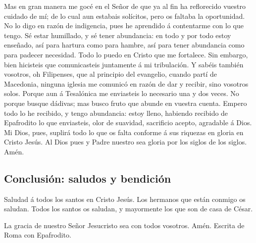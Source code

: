  Mas en gran manera me gocé en el Señor de que ya al fin
ha reflorecido vuestro cuidado de mí; de lo cual aun estabais solícitos,
pero os faltaba la oportunidad.  No lo digo en razón de
indigencia, pues he aprendido á contentarme con lo que tengo.
 Sé estar humillado, y sé tener abundancia: en todo y por
todo estoy enseñado, así para hartura como para hambre, así para tener
abundancia como para padecer necesidad.  Todo lo puedo en
Cristo que me fortalece.  Sin embargo, bien hicisteis que
comunicasteis juntamente á mi tribulación.  Y sabéis
también vosotros, oh Filipenses, que al principio del evangelio, cuando
partí de Macedonia, ninguna iglesia me comunicó en razón de dar y
recibir, sino vosotros solos.  Porque aun á Tesalónica me
enviasteis lo necesario una y dos veces.  No porque
busque dádivas; mas busco fruto que abunde en vuestra cuenta.
 Empero todo lo he recibido, y tengo abundancia: estoy
lleno, habiendo recibido de Epafrodito lo que enviasteis, olor de
suavidad, sacrificio acepto, agradable á Dios.  Mi Dios,
pues, suplirá todo lo que os falta conforme á sus riquezas en gloria en
Cristo Jesús.  Al Dios pues y Padre nuestro sea gloria
por los siglos de los siglos. Amén.

\hypertarget{conclusiuxf3n-saludos-y-bendiciuxf3n}{%
\subsection{Conclusión: saludos y
bendición}\label{conclusiuxf3n-saludos-y-bendiciuxf3n}}

 Saludad á todos los santos en Cristo Jesús. Los hermanos
que están conmigo os saludan.  Todos los santos os
saludan, y mayormente los que son de casa de César.

 La gracia de nuestro Señor Jesucristo sea con todos
vosotros. Amén. Escrita de Roma con Epafrodito.
